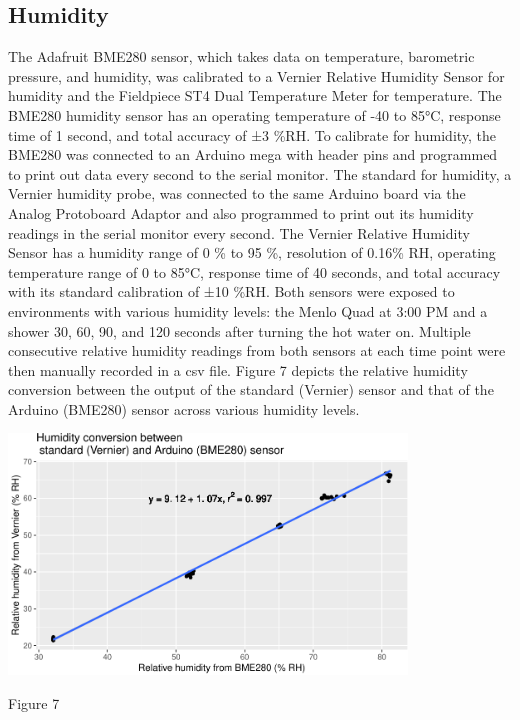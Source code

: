 \documentclass[12pt,]{article}
\begin{document}
\subsection{Humidity}\label{humidity}

The Adafruit BME280 sensor, which takes data on temperature, barometric
pressure, and humidity, was calibrated to a Vernier Relative Humidity
Sensor for humidity and the Fieldpiece ST4 Dual Temperature Meter for
temperature. The BME280 humidity sensor has an operating temperature of
-40 to 85°C, response time of 1 second, and total accuracy of ±3 \%RH.
To calibrate for humidity, the BME280 was connected to an Arduino mega
with header pins and programmed to print out data every second to the
serial monitor. The standard for humidity, a Vernier humidity probe, was
connected to the same Arduino board via the Analog Protoboard Adaptor
and also programmed to print out its humidity readings in the serial
monitor every second. The Vernier Relative Humidity Sensor has a
humidity range of 0 \% to 95 \%, resolution of 0.16\% RH, operating
temperature range of 0 to 85°C, response time of 40 seconds, and total
accuracy with its standard calibration of ±10 \%RH. Both sensors were
exposed to environments with various humidity levels: the Menlo Quad at
3:00 PM and a shower 30, 60, 90, and 120 seconds after turning the hot
water on. Multiple consecutive relative humidity readings from both
sensors at each time point were then manually recorded in a csv file.
Figure 7 depicts the relative humidity conversion between the output of
the standard (Vernier) sensor and that of the Arduino (BME280) sensor
across various humidity levels.

\begin{center}\includegraphics[width=400px]{paper_files/figure-latex/bme-1} \end{center}

Figure 7
\end{document}

